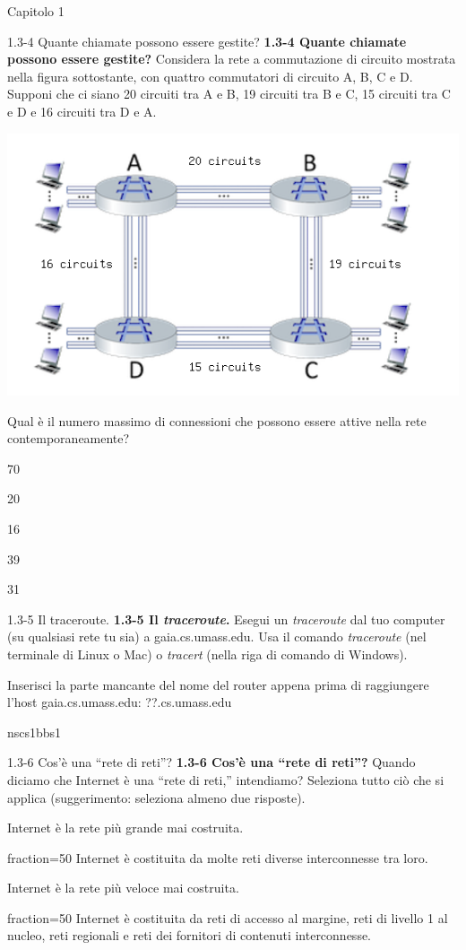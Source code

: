 \documentclass[a4paper]{article}
\begin{document}
\begin{quiz}{Capitolo 1}
\begin{multi}[points=1,shuffle=true]{1.3-4 Quante chiamate possono essere gestite?}
\textbf{1.3-4 Quante chiamate possono essere gestite?}
Considera la rete a commutazione di circuito mostrata nella figura sottostante, con quattro commutatori di circuito A, B, C e D. Supponi che ci siano 20 circuiti tra A e B, 19 circuiti tra B e C, 15 circuiti tra C e D e 16 circuiti tra D e A.
\begin{center}
\includegraphics[width=\linewidth]{figs/1.3.4.png}
\end{center}
Qual è il numero massimo di connessioni che possono essere attive nella rete contemporaneamente?
\item* 70
\item 20
\item 16
\item 39
\item 31
\end{multi}

\begin{shortanswer}[points=1,shuffle=true]{1.3-5 Il traceroute.}
\textbf{1.3-5 Il \textit{traceroute}.}
Esegui un \textit{traceroute} dal tuo computer (su qualsiasi rete tu sia) a gaia.cs.umass.edu. Usa il comando \textit{traceroute} (nel terminale di Linux o Mac) o \textit{tracert} (nella riga di comando di Windows).

Inserisci la parte mancante del nome del router appena prima di raggiungere l'host gaia.cs.umass.edu: ??.cs.umass.edu
\item nscs1bbs1
\end{shortanswer}

\begin{multi}[points=1,shuffle=true,multiple]{1.3-6 Cos'è una ``rete di reti''?}
\textbf{1.3-6 Cos'è una ``rete di reti''?}
Quando diciamo che Internet è una ``rete di reti,'' intendiamo? Seleziona tutto ciò che si applica (suggerimento: seleziona almeno due risposte).
\item Internet è la rete più grande mai costruita.
\item[fraction=50] Internet è costituita da molte reti diverse interconnesse tra loro.
\item Internet è la rete più veloce mai costruita.
\item[fraction=50] Internet è costituita da reti di accesso al margine, reti di livello 1 al nucleo, reti regionali e reti dei fornitori di contenuti interconnesse.
\end{multi}


\end{quiz}
\end{document}
